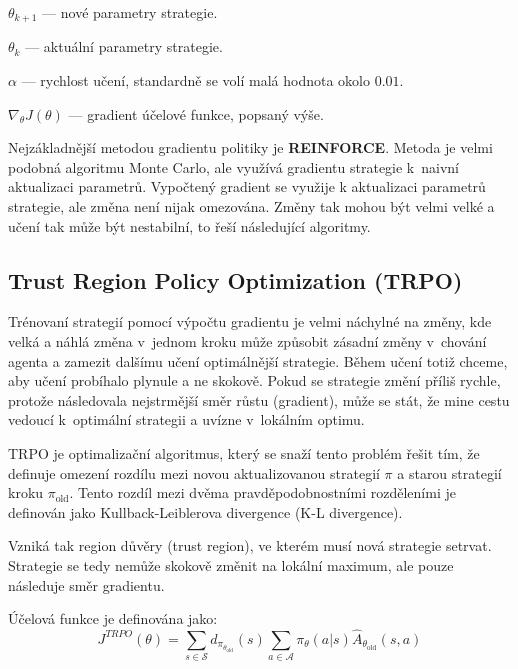 \begin{myitemize}
  \item $\theta_{k+1}$ --- nové parametry strategie.
  \item $\theta_k$ --- aktuální parametry strategie.
  \item $\alpha$ --- rychlost učení, standardně se volí malá hodnota okolo $0.01$.
  \item $\nabla_\theta J(\theta)$ --- gradient účelové funkce, popsaný výše.
\end{myitemize}

Nejzákladnější metodou gradientu politiky je \textbf{REINFORCE}.
Metoda je velmi podobná algoritmu Monte Carlo, ale využívá gradientu strategie k~naivní aktualizaci parametrů.
Vypočtený gradient se využije k aktualizaci parametrů strategie, ale změna není nijak omezována.
Změny tak mohou být velmi velké a učení tak může být nestabilní, to řeší následující algoritmy.

\pagebreak

\subsection{Trust Region Policy Optimization (TRPO)}\label{sec:trust-region-policy-optimization}
Trénovaní strategií pomocí výpočtu gradientu je velmi náchylné na změny, kde velká a náhlá změna v~jednom kroku může způsobit zásadní změny v~chování agenta a zamezit dalšímu učení optimálnější strategie.
Během učení totiž chceme, aby učení probíhalo plynule a ne skokově.
Pokud se strategie změní příliš rychle, protože následovala nejstrmější směr růstu (gradient), může se stát, že mine cestu vedoucí k~optimální strategii a uvízne v~lokálním optimu.

TRPO je optimalizační algoritmus, který se snaží tento problém řešit tím, že definuje omezení rozdílu mezi novou aktualizovanou strategií \textbf{$\pi$} a starou strategií kroku \textbf{$\pi_{\text{old}}$}.
Tento rozdíl mezi dvěma pravděpodobnostními rozděleními je definován jako Kullback-Leiblerova divergence (K-L divergence)\cite{KL_divergence}.

Vzniká tak region důvěry (trust region), ve kterém musí nová strategie setrvat.
Strategie se tedy nemůže skokově změnit na lokální maximum, ale pouze následuje směr gradientu.

Účelová funkce je definována jako:
\begin{equation}
  J^{TRPO}(\theta) = \sum_{s \in \mathcal{S}} d_{\pi_{\theta_{\text{old}}}}(s) \sum_{a \in \mathcal{A}} \pi_{\theta}(a \vert s) \hat{A}_{\theta_{\text{old}}}(s, a)
\end{equation}

